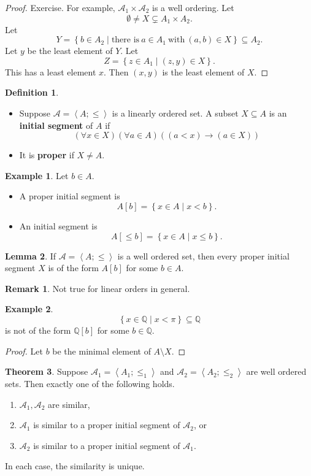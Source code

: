 \documentclass{article}
\newcommand{\Q}{\mathbb{Q}}
\newcommand{\A}{\mathcal{A}}
\newcommand{\rb}[1]{\left( #1 \right)}
\renewcommand{\sb}[1]{\left[ #1 \right]}
\newcommand{\cb}[1]{\left\{ #1 \right\}}
\newcommand{\ab}[1]{\left\langle #1 \right\rangle}
\newcommand{\impb}[2]{\rb{#1 \rightarrow #2}}
\newcommand{\fab}[1]{\rb{\forall #1}}
\newcommand{\ltb}[2]{\rb{#1 < #2}}
\newcommand{\inb}[2]{\rb{#1 \in #2}}
\theoremstyle{definition}\newtheorem{definition}{Definition}[subsection]
\theoremstyle{definition}\newtheorem{remark1}[definition]{Remark}
\theoremstyle{definition}\newtheorem{example1}[definition]{Example}
\theoremstyle{definition}\newtheorem*{remark2}{Remark}
\theoremstyle{definition}\newtheorem*{example2}{Example}
\theoremstyle{definition}\newtheorem*{note}{Note}
\theoremstyle{definition}\newtheorem*{notation}{Notation}
\newtheorem{lemma}[definition]{Lemma}
\newtheorem{theorem}[definition]{Theorem}
\begin{document}
\begin{proof}
Exercise. For example, $ \A_1 \times \A_2 $ is a well ordering. Let
$$ \emptyset \ne X \subsetneq A_1 \times A_2. $$
Let
$$ Y = \cb{b \in A_2 \mid \text{there is} \ a \in A_1 \ \text{with} \ \rb{a, b} \in X} \subseteq A_2. $$
Let $ y $ be the least element of $ Y $. Let
$$ Z = \cb{z \in A_1 \mid \rb{z, y} \in X}. $$
This has a least element $ x $. Then $ \rb{x, y} $ is the least element of $ X $.
\end{proof}

\begin{definition}
\hfill
\begin{itemize}
\item Suppose $ \A = \ab{A; \le} $ is a linearly ordered set. A subset $ X \subseteq A $ is an \textbf{initial segment} of $ A $ if
$$ \fab{x \in X}\fab{a \in A}\impb{\ltb{a}{x}}{\inb{a}{X}} $$
\item It is \textbf{proper} if $ X \ne A $.
\end{itemize}
\end{definition}

\begin{example2}
Let $ b \in A $.
\begin{itemize}
\item A proper initial segment is
$$ A\sb{b} = \cb{x \in A \mid x < b}. $$
\item An initial segment is
$$ A\sb{\le b} = \cb{x \in A \mid x \le b}. $$
\end{itemize}
\end{example2}

\begin{lemma}
\label{lem:3.3.6}
If $ \A = \ab{A; \le} $ is a well ordered set, then every proper initial segment $ X $ is of the form $ A\sb{b} $ for some $ b \in A $.
\end{lemma}

\begin{remark2}
Not true for linear orders in general.
\end{remark2}

\begin{example2}
$$ \cb{x \in \Q \mid x < \pi} \subseteq \Q $$
is not of the form $ \Q\sb{b} $ for some $ b \in \Q $.
\end{example2}

\begin{proof}
Let $ b $ be the minimal element of $ A \setminus X $.
\end{proof}

\begin{theorem}
\label{thm:3.3.7}
Suppose $ \A_1 = \ab{A_1; \le_1} $ and $ \A_2 = \ab{A_2; \le_2} $ are well ordered sets. Then exactly one of the following holds.
\begin{enumerate}
\item $ \A_1, \A_2 $ are similar,
\item $ \A_1 $ is similar to a proper initial segment of $ \A_2 $, or
\item $ \A_2 $ is similar to a proper initial segment of $ \A_1 $.
\end{enumerate}
In each case, the similarity is unique.
\end{theorem}
\end{document}
